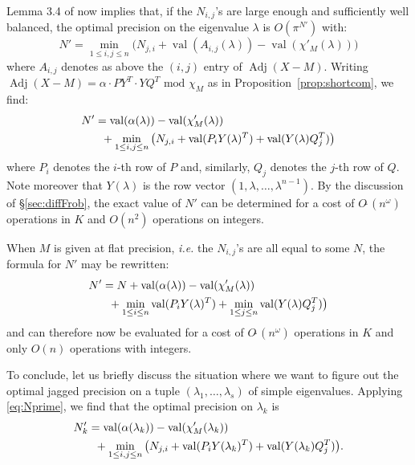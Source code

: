 \documentclass{sig-alternate-05-2015}
\DeclareMathOperator{\val}{val}
\DeclareMathOperator{\adj}{Adj}
\newcommand{\softO}{O\tilde{~}}
\begin{document}
\noindent
Lemma 3.4 of \cite{caruso-roe-vaccon:14a} now implies that, if the
$N_{i,j}$'s are large enough and sufficiently well balanced, the optimal
precision on the eigenvalue $\lambda$ is $O(\pi^{N'})$ with:
$$N' = \min_{1 \leq i, j\leq n} \big(N_{j,i} + \val(A_{i,j}(\lambda)) - 
\val(\chi'_M(\lambda))\big)$$
where $A_{i,j}$ denotes as above the $(i,j)$ entry of $\adj(X{-}M)$.
Writing
$\adj(X{-}M) = \alpha \cdot P Y^T \cdot Y Q^T \text{ mod } \chi_M$
as in Proposition~\ref{prop:shortcom}, we find:
\begin{align}
N' & = \val(\alpha(\lambda)) - \val(\chi'_M(\lambda)) \nonumber \\
& \hspace{2mm} + \min_{1 \leq i, j\leq n} \big(N_{j,i} + 
\val(P_i Y(\lambda)^T) + \val(Y(\lambda) Q_j^T)\big) \label{eq:Nprime}
\end{align}
where $P_i$ denotes the $i$-th row of $P$ and, similarly, $Q_j$
denotes the $j$-th row of $Q$. Note moreover that $Y(\lambda)$ is
the row vector $(1, \lambda, \ldots, \lambda^{n-1})$.
By the discussion of \S \ref{sec:diffFrob}, the exact value of $N'$ can be 
determined for a cost of $\softO(n^\omega)$ operations in $K$ and
$O(n^2)$ operations on integers. 

When $M$ is given at flat precision, \emph{i.e.} the $N_{i,j}$'s are all 
equal to some $N$, the formula for $N'$ may be rewritten:
\begin{align}
N' & = N + \val(\alpha(\lambda)) - \val(\chi'_M(\lambda)) \nonumber \\
& \hspace{2mm} + \min_{1 \leq i \leq n} \val(P_i Y(\lambda)^T)
+ \min_{1 \leq j \leq n} \val(Y(\lambda) Q_j^T)\big) \label{eq:Nprimeflat}
\end{align}
and can therefore now be evaluated for a cost of $\softO(n^\omega)$
operations in $K$ and only $O(n)$ operations with integers.

\medskip

To conclude, let us briefly discuss the situation where we want
to figure out the optimal jagged precision on a tuple $(\lambda_1,
\ldots, \lambda_s)$ of simple eigenvalues. Applying \eqref{eq:Nprime},
we find that the optimal precision on $\lambda_k$ is 
\begin{align*}
N'_k & = \val(\alpha(\lambda_k)) - \val(\chi'_M(\lambda_k)) \\
& \hspace{2mm} + \min_{1 \leq i, j\leq n} \big(N_{j,i} + 
\val(P_i Y(\lambda_k)^T) + \val(Y(\lambda_k) Q_j^T)\big).
\end{align*}
\end{document}
